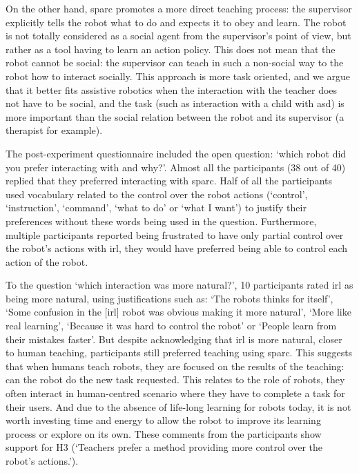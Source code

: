 On the other hand, \gls{sparc} promotes a more direct teaching process: the supervisor explicitly tells the robot what to do and expects it to obey and learn. The robot is not totally considered as a social agent from the supervisor's point of view, but rather as a tool having to learn an action policy. This does not mean that the robot cannot be social: the supervisor can teach in such a non-social way to the robot how to interact socially. This approach is more task oriented, and we argue that it better fits assistive robotics when the interaction with the teacher does not have to be social, and the task (such as interaction with a child with \gls{asd}) is more important than the social relation between the robot and its supervisor (a therapist for example).

The post-experiment questionnaire included the open question: `which robot did you prefer interacting with and why?'. Almost all the participants (38 out of 40) replied that they preferred interacting with \gls{sparc}. Half of all the participants used vocabulary related to the control over the robot actions (`control', `instruction', `command', `what to do' or `what I want') to justify their preferences without these words being used in the question. Furthermore, multiple participants reported being frustrated to have only partial control over the robot's actions with \gls{irl}, they would have preferred being able to control each action of the robot. 

To the question `which interaction was more natural?', 10 participants rated \gls{irl} as being more natural, using justifications such as: `The robots thinks for itself', `Some confusion in the [\gls{irl}] robot was obvious making it more natural', `More like real learning', `Because it was hard to control the robot' or `People learn from their mistakes faster'. But despite acknowledging that \gls{irl} is more natural, closer to human teaching, participants still preferred teaching using \gls{sparc}. This suggests that when humans teach robots, they are focused on the results of the teaching: can the robot do the new task requested. This relates to the role of robots, they often interact in human-centred scenario where they have to complete a task for their users. And due to the absence of life-long learning for robots today, it is not worth investing time and energy to allow the robot to improve its learning process or explore on its own. These comments from the participants show support for H3 (`Teachers prefer a method providing more control over the robot's actions.').

